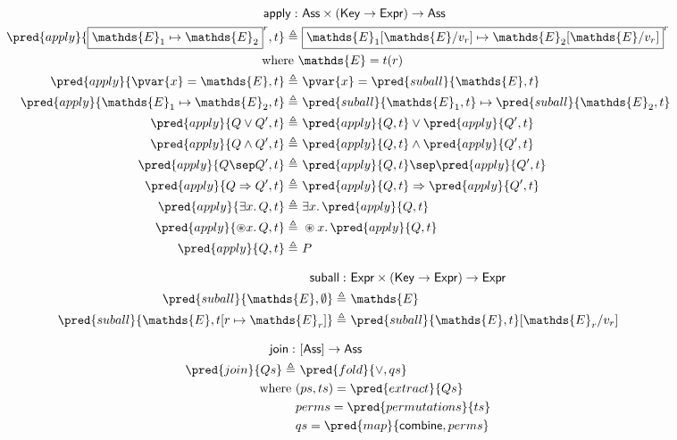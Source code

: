 \begin{align*}
\mathsf{apply} :&\ \mathsf{Ass} \times (\mathsf{Key} \rightarrow \mathsf{Expr}) \rightarrow \mathsf{Ass} \\
\pred{apply}{\boxed{\mathds{E}_1 \mapsto \mathds{E}_2}^r, t} \triangleq&\ \boxed{\mathds{E}_1[\mathds{E}/v_r] \mapsto \mathds{E}_2[\mathds{E}/v_r]}^r \\
\text{where }& \mathds{E} = t(r) \\
\pred{apply}{\pvar{x} = \mathds{E}, t} \triangleq&\ \pvar{x} = \pred{suball}{\mathds{E}, t} \\
\pred{apply}{\mathds{E}_1 \mapsto \mathds{E}_2, t} \triangleq&\ \pred{suball}{\mathds{E}_1, t} \mapsto \pred{suball}{\mathds{E}_2, t} \\
\pred{apply}{Q \lor Q', t} \triangleq&\ \pred{apply}{Q, t} \lor \pred{apply}{Q', t} \\
\pred{apply}{Q \land Q', t} \triangleq&\ \pred{apply}{Q, t} \land \pred{apply}{Q', t} \\
\pred{apply}{Q \sep Q', t} \triangleq&\ \pred{apply}{Q, t} \sep \pred{apply}{Q', t} \\
\pred{apply}{Q \Rightarrow Q', t} \triangleq&\ \pred{apply}{Q, t} \Rightarrow \pred{apply}{Q', t} \\
\pred{apply}{\exists x \ldotp Q, t} \triangleq&\ \exists x \ldotp \pred{apply}{Q, t} \\
\pred{apply}{\circledast x \ldotp Q, t} \triangleq&\ \circledast x \ldotp \pred{apply}{Q, t} \\
\pred{apply}{Q, t} \triangleq&\ P
\end{align*}

\begin{align*}
\mathsf{suball} :&\ \mathsf{Expr} \times (\mathsf{Key} \rightarrow \mathsf{Expr}) \rightarrow \mathsf{Expr} \\
\pred{suball}{\mathds{E}, \emptyset} \triangleq&\ \mathds{E} \\
\pred{suball}{\mathds{E}, t[r \mapsto \mathds{E}_r]} \triangleq&\ \pred{suball}{\mathds{E}, t}[\mathds{E}_r / v_r]
\end{align*}

\begin{align*}
\mathsf{join} :&\ [\mathsf{Ass}] \rightarrow \mathsf{Ass} \\
\pred{join}{Qs} \triangleq&\ \pred{fold}{\lor, qs} \\
	\text{where }& (ps, ts) = \pred{extract}{Qs} \\
		& perms = \pred{permutations}{ts} \\
		& qs = \pred{map}{\mathsf{combine}, perms} \\
\end{align*}

